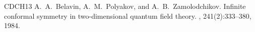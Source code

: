 \documentclass[oneside,english]{amsart}
\numberwithin{equation}{section}
\numberwithin{figure}{section}
\theoremstyle{plain}
\theoremstyle{plain}
\theoremstyle{plain}
\theoremstyle{remark}
\theoremstyle{plain}
\theoremstyle{plain}
\theoremstyle{plain}
\theoremstyle{plain}
\theoremstyle{plain}
\theoremstyle{plain}
\theoremstyle{plain}
\theoremstyle{plain}
\begin{document}
\begin{thebibliography}{CDCH{\etalchar{+}}13}
A.~A.~Belavin, A.~M.~Polyakov, and A.~B.~Zamolodchikov.
\newblock Infinite conformal symmetry in two-dimensional quantum field theory.
, 241(2):333--380, 1984.










\end{thebibliography}
\end{document}
